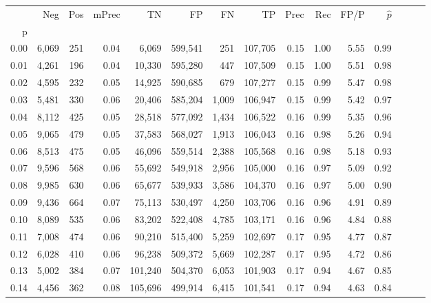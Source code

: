 \begin{tabular}{rrrrrrrrrrrrrrr}
\toprule
{} &     Neg &    Pos & mPrec &       TN &       FP &       FN &       TP &  Prec &   Rec &  FP/P & $\hat{p}$ \\
p    &         &        &       &          &          &          &          &       &       &       &           \\
\midrule
0.00 &   6,069 &    251 &  0.04 &    6,069 &  599,541 &      251 &  107,705 &  0.15 &  1.00 &  5.55 &      0.99 \\
0.01 &   4,261 &    196 &  0.04 &   10,330 &  595,280 &      447 &  107,509 &  0.15 &  1.00 &  5.51 &      0.98 \\
0.02 &   4,595 &    232 &  0.05 &   14,925 &  590,685 &      679 &  107,277 &  0.15 &  0.99 &  5.47 &      0.98 \\
0.03 &   5,481 &    330 &  0.06 &   20,406 &  585,204 &    1,009 &  106,947 &  0.15 &  0.99 &  5.42 &      0.97 \\
0.04 &   8,112 &    425 &  0.05 &   28,518 &  577,092 &    1,434 &  106,522 &  0.16 &  0.99 &  5.35 &      0.96 \\
0.05 &   9,065 &    479 &  0.05 &   37,583 &  568,027 &    1,913 &  106,043 &  0.16 &  0.98 &  5.26 &      0.94 \\
0.06 &   8,513 &    475 &  0.05 &   46,096 &  559,514 &    2,388 &  105,568 &  0.16 &  0.98 &  5.18 &      0.93 \\
0.07 &   9,596 &    568 &  0.06 &   55,692 &  549,918 &    2,956 &  105,000 &  0.16 &  0.97 &  5.09 &      0.92 \\
0.08 &   9,985 &    630 &  0.06 &   65,677 &  539,933 &    3,586 &  104,370 &  0.16 &  0.97 &  5.00 &      0.90 \\
0.09 &   9,436 &    664 &  0.07 &   75,113 &  530,497 &    4,250 &  103,706 &  0.16 &  0.96 &  4.91 &      0.89 \\
0.10 &   8,089 &    535 &  0.06 &   83,202 &  522,408 &    4,785 &  103,171 &  0.16 &  0.96 &  4.84 &      0.88 \\
0.11 &   7,008 &    474 &  0.06 &   90,210 &  515,400 &    5,259 &  102,697 &  0.17 &  0.95 &  4.77 &      0.87 \\
0.12 &   6,028 &    410 &  0.06 &   96,238 &  509,372 &    5,669 &  102,287 &  0.17 &  0.95 &  4.72 &      0.86 \\
0.13 &   5,002 &    384 &  0.07 &  101,240 &  504,370 &    6,053 &  101,903 &  0.17 &  0.94 &  4.67 &      0.85 \\
0.14 &   4,456 &    362 &  0.08 &  105,696 &  499,914 &    6,415 &  101,541 &  0.17 &  0.94 &  4.63 &      0.84 \\

\end{tabular}
